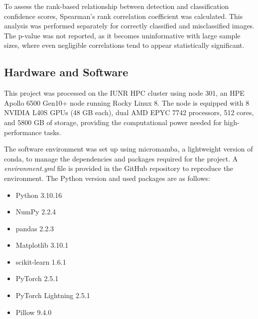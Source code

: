     To assess the rank-based relationship between detection and classification confidence scores, Spearman's rank correlation coefficient was calculated. 
    This analysis was performed separately for correctly classified and misclassified images. 
    The p-value was not reported, as it becomes uninformative with large sample sizes, where even negligible correlations tend to appear statistically significant.

    \subsection{Hardware and Software}
    This project was processed on the \ac{IUNR} \ac{HPC} cluster using node 301, an HPE Apollo 6500 Gen10+ node running Rocky Linux 8. 
    The node is equipped with 8 NVIDIA L40S \acp{GPU} (48 \ac{GB} each), dual AMD EPYC 7742 processors, 512 cores, and 5800 \ac{GB} of storage, providing the computational power needed for high-performance tasks.

    The software environment was set up using micromamba, a lightweight version of conda, to manage the dependencies and packages required for the project.
    A \textit{environment.yml} file is provided in the GitHub repository to reproduce the environment.
    The Python version and used packages are as follows:

    \begin{itemize}
        \item Python 3.10.16
        \item NumPy 2.2.4
        \item pandas 2.2.3
        \item Matplotlib 3.10.1
        \item scikit-learn 1.6.1
        \item PyTorch 2.5.1
        \item PyTorch Lightning 2.5.1
        \item Pillow 9.4.0
    \end{itemize}


